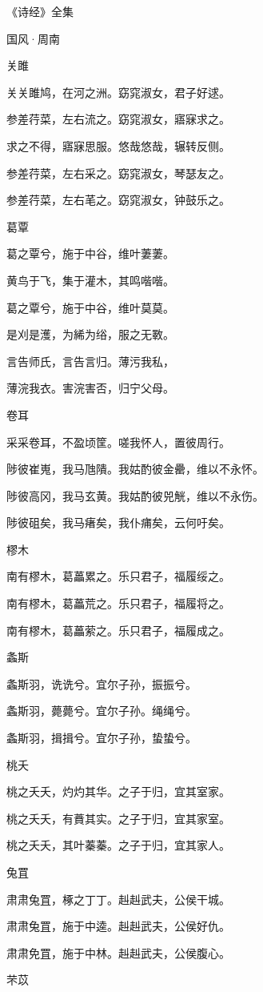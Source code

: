 《诗经》全集  

国风·周南


关雎

关关雎鸠，在河之洲。窈窕淑女，君子好逑。

参差荇菜，左右流之。窈窕淑女，寤寐求之。

求之不得，寤寐思服。悠哉悠哉，辗转反侧。

参差荇菜，左右采之。窈窕淑女，琴瑟友之。

参差荇菜，左右芼之。窈窕淑女，钟鼓乐之。

葛覃

葛之覃兮，施于中谷，维叶萋萋。

黄鸟于飞，集于灌木，其鸣喈喈。

葛之覃兮，施于中谷，维叶莫莫。

是刈是濩，为絺为绤，服之无斁。

言告师氏，言告言归。薄污我私，

薄浣我衣。害浣害否，归宁父母。

卷耳

采采卷耳，不盈顷筐。嗟我怀人，置彼周行。

陟彼崔嵬，我马虺隤。我姑酌彼金罍，维以不永怀。

陟彼高冈，我马玄黄。我姑酌彼兕觥，维以不永伤。

陟彼砠矣，我马瘏矣，我仆痡矣，云何吁矣。

樛木

南有樛木，葛藟累之。乐只君子，福履绥之。

南有樛木，葛藟荒之。乐只君子，福履将之。

南有樛木，葛藟萦之。乐只君子，福履成之。

螽斯

螽斯羽，诜诜兮。宜尔子孙，振振兮。

螽斯羽，薨薨兮。宜尔子孙。绳绳兮。

螽斯羽，揖揖兮。宜尔子孙，蛰蛰兮。

桃夭

桃之夭夭，灼灼其华。之子于归，宜其室家。

桃之夭夭，有蕡其实。之子于归，宜其家室。

桃之夭夭，其叶蓁蓁。之子于归，宜其家人。

兔罝

肃肃兔罝，椓之丁丁。赳赳武夫，公侯干城。

肃肃兔罝，施于中逵。赳赳武夫，公侯好仇。

肃肃免罝，施于中林。赳赳武夫，公侯腹心。

芣苡

